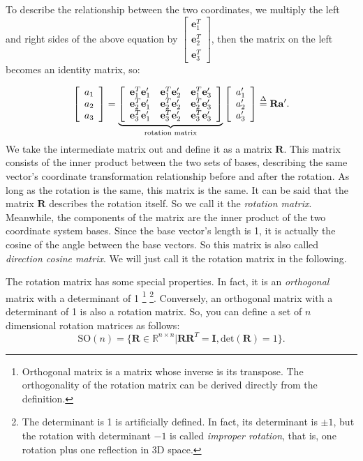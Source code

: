 To describe the relationship between the two coordinates, we multiply the left and right sides of the above equation by $ \left [ \begin {array}{l}
\mathbf{e}_1^T\\
\mathbf{e}_2^T\\
\mathbf{e}_3^T
\end {array} \right ] $, then the matrix on the left becomes an identity matrix, so:

\begin{equation}
\left[ \begin{array}{l}
{a_1}\\
{a_2}\\
{a_3}
\end{array}\right]=\underbrace{\left[{\begin{array}{*{20}{c}}    
    {\mathbf{e}_1^T\mathbf{e}_1'} & {\mathbf{e}_1^T\mathbf{e}_2'} & {\mathbf{e}_1^T\mathbf{e}_3'}\\
    {\mathbf{e}_2^T\mathbf{e}_1'} & {\mathbf{e}_2^T\mathbf{e}_2'} & {\mathbf{e}_2^T\mathbf{e}_3'}\\
    {\mathbf{e}_3^T\mathbf{e}_1'} & {\mathbf{e}_3^T\mathbf{e}_2'} & {\mathbf{e}_3^T\mathbf{e}_3'}
    \end{array}} \right]}_{\text{rotation matrix}}\left[ \begin{array}{l}
a_1'\\
a_2'\\
a_3'
\end{array} \right] \buildrel \Delta \over = \mathbf{R} \mathbf{a}'.
\end{equation}
We take the intermediate matrix out and define it as a matrix $ \mathbf{R}$. This matrix consists of the inner product between the two sets of bases, describing the same vector's coordinate transformation relationship before and after the rotation. As long as the rotation is the same, this matrix is the same. It can be said that the matrix $ \mathbf{R} $ describes the rotation itself. So we call it the \textit{rotation matrix}. Meanwhile, the components of the matrix are the inner product of the two coordinate system bases. Since the base vector's length is 1, it is actually the cosine of the angle between the base vectors. So this matrix is also called \textit{direction cosine matrix}. We will just call it the rotation matrix in the following.

The rotation matrix has some special properties. In fact, it is an \textit{orthogonal} matrix with a determinant of 1 \footnote{Orthogonal matrix is a matrix whose inverse is its transpose. The orthogonality of the rotation matrix can be derived directly from the definition. } \footnote{The determinant is 1 is artificially defined. In fact, its determinant is $\pm 1 $, but the rotation with determinant $ - 1 $ is called \textit{improper rotation}, that is, one rotation plus one reflection in 3D space. }. Conversely, an orthogonal matrix with a determinant of 1 is also a rotation matrix. So, you can define a set of $n$ dimensional rotation matrices as follows:
\begin{equation}
\mathrm{SO}(n) = \{ \mathbf{R} \in \mathbb{R}^{n \times n} | \mathbf{R R}^T = \mathbf{I}, \mathrm{det} (\mathbf{R})=1 \}.
\end{equation}

